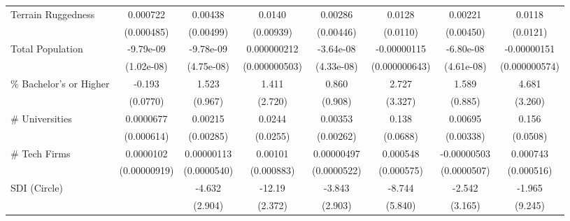{\begin{tabular}{l*{7}{c}}
\addlinespace
Terrain Ruggedness  &    0.000722         &     0.00438         &      0.0140         &     0.00286         &      0.0128         &     0.00221         &      0.0118         \\
                    &  (0.000485)         &   (0.00499)         &   (0.00939)         &   (0.00446)         &    (0.0110)         &   (0.00450)         &    (0.0121)         \\
\addlinespace
Total Population    &   -9.79e-09         &   -9.78e-09         & 0.000000212         &   -3.64e-08         & -0.00000115         &   -6.80e-08         & -0.00000151\sym{**} \\
                    &  (1.02e-08)         &  (4.75e-08)         &(0.000000503)         &  (4.33e-08)         &(0.000000643)         &  (4.61e-08)         &(0.000000574)         \\
\addlinespace
\% Bachelor's or Higher&      -0.193\sym{*}  &       1.523         &       1.411         &       0.860         &       2.727         &       1.589         &       4.681         \\
                    &    (0.0770)         &     (0.967)         &     (2.720)         &     (0.908)         &     (3.327)         &     (0.885)         &     (3.260)         \\
\addlinespace
\# Universities     &   0.0000677         &     0.00215         &      0.0244         &     0.00353         &       0.138\sym{*}  &     0.00695\sym{*}  &       0.156\sym{**} \\
                    &  (0.000614)         &   (0.00285)         &    (0.0255)         &   (0.00262)         &    (0.0688)         &   (0.00338)         &    (0.0508)         \\
\addlinespace
\# Tech Firms       &   0.0000102         &  0.00000113         &     0.00101         &  0.00000497         &    0.000548         & -0.00000503         &    0.000743         \\
                    &(0.00000919)         & (0.0000540)         &  (0.000883)         & (0.0000522)         &  (0.000575)         & (0.0000507)         &  (0.000516)         \\
\addlinespace
SDI (Circle)        &                     &      -4.632         &      -12.19\sym{***}&      -3.843         &      -8.744         &      -2.542         &      -1.965         \\
                    &                     &     (2.904)         &     (2.372)         &     (2.903)         &     (5.840)         &     (3.165)         &     (9.245)         \\

\end{tabular}}
